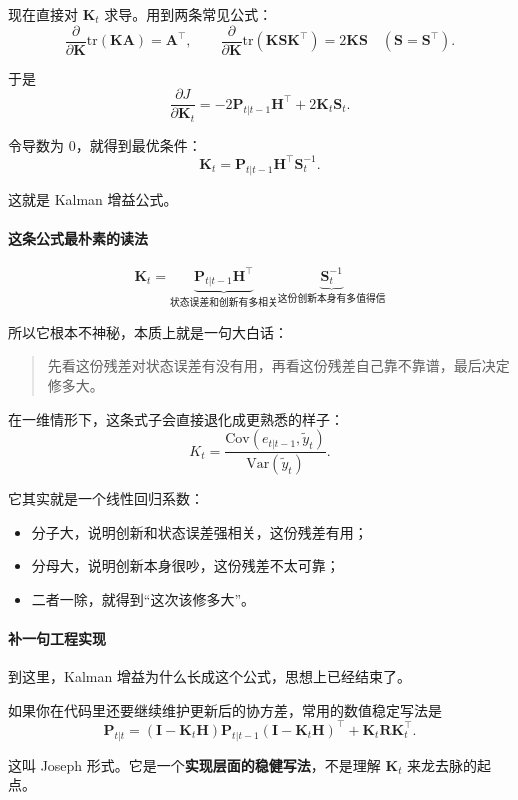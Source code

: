 \documentclass[12pt,a4paper]{ctexart}
\begin{document}
现在直接对
\(\bm{K}_t\)
求导。用到两条常见公式：
\[
\frac{\partial}{\partial \bm{K}}
\mathrm{tr}(\bm{K}\bm{A})
= \bm{A}^\top,
\qquad
\frac{\partial}{\partial \bm{K}}
\mathrm{tr}(\bm{K}\bm{S}\bm{K}^\top)
= 2\bm{K}\bm{S}
\quad(\bm{S}=\bm{S}^\top).
\]

于是
\[
\frac{\partial J}{\partial \bm{K}_t}
= -2\bm{P}_{t|t-1}\bm{H}^\top + 2\bm{K}_t\bm{S}_t.
\]

令导数为 0，就得到最优条件：
\[
\bm{K}_t
= \bm{P}_{t|t-1}\bm{H}^\top\bm{S}_t^{-1}.
\]

这就是 Kalman 增益公式。

\paragraph{这条公式最朴素的读法}

\[
\bm{K}_t
=
\underbrace{\bm{P}_{t|t-1}\bm{H}^\top}_{\text{状态误差和创新有多相关}}
\underbrace{\bm{S}_t^{-1}}_{\text{这份创新本身有多值得信}}
\]

所以它根本不神秘，本质上就是一句大白话：

\begin{quote}
先看这份残差对状态误差有没有用，再看这份残差自己靠不靠谱，最后决定修多大。
\end{quote}

在一维情形下，这条式子会直接退化成更熟悉的样子：
\[
K_t
= \frac{\mathrm{Cov}(e_{t|t-1},\tilde{y}_t)}{\mathrm{Var}(\tilde{y}_t)}.
\]

它其实就是一个线性回归系数：
\begin{itemize}
  \item 分子大，说明创新和状态误差强相关，这份残差有用；
  \item 分母大，说明创新本身很吵，这份残差不太可靠；
  \item 二者一除，就得到“这次该修多大”。
\end{itemize}

\paragraph{补一句工程实现}

到这里，Kalman 增益为什么长成这个公式，思想上已经结束了。

如果你在代码里还要继续维护更新后的协方差，常用的数值稳定写法是
\[
\bm{P}_{t|t}
= (\bm{I} - \bm{K}_t\bm{H})\bm{P}_{t|t-1}(\bm{I} - \bm{K}_t\bm{H})^\top
+ \bm{K}_t\bm{R}\bm{K}_t^\top.
\]

这叫 Joseph 形式。它是一个\textbf{实现层面的稳健写法}，不是理解
\(\bm{K}_t\)
来龙去脉的起点。
\end{document}
